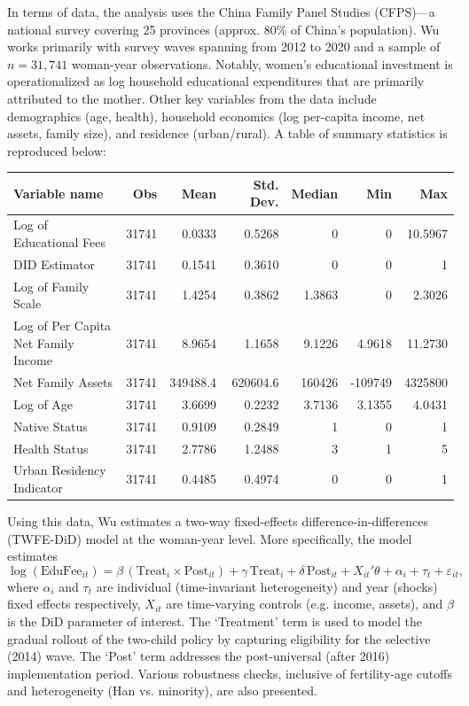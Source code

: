 \documentclass[11pt,answers]{exam}
\begin{document}
\begin{questions}
In terms of data, the analysis uses the China Family Panel Studies (CFPS)---a national survey covering 25 provinces (approx. 80\% of China's population). Wu works primarily with survey waves spanning from 2012 to 2020 and a sample of $n=31{,}741$ woman-year observations. Notably, women's educational investment is operationalized as log household educational expenditures that are primarily attributed to the mother. Other key variables from the data include demographics (age, health), household economics (log per-capita income, net assets, family size), and residence (urban/rural). A table of summary statistics is reproduced below:

  \small
  \begin{tabular}{lrrrrrr}
    \hline
    \textbf{Variable name} & \textbf{Obs} & \textbf{Mean} & \textbf{Std. Dev.} & \textbf{Median} & \textbf{Min} & \textbf{Max} \\
    \hline
    Log of Educational Fees                 & 31741 & 0.0333 & 0.5268 & 0       & 0       & 10.5967 \\
    DID Estimator                           & 31741 & 0.1541 & 0.3610 & 0       & 0       & 1       \\
    Log of Family Scale                     & 31741 & 1.4254 & 0.3862 & 1.3863  & 0       & 2.3026  \\
    Log of Per Capita Net Family Income     & 31741 & 8.9654 & 1.1658 & 9.1226  & 4.9618  & 11.2730 \\
    Net Family Assets                       & 31741 & 349488.4 & 620604.6 & 160426 & -109749 & 4325800 \\
    Log of Age                              & 31741 & 3.6699 & 0.2232 & 3.7136  & 3.1355  & 4.0431  \\
    Native Status                           & 31741 & 0.9109 & 0.2849 & 1       & 0       & 1       \\
    Health Status                           & 31741 & 2.7786 & 1.2488 & 3       & 1       & 5       \\
    Urban Residency Indicator               & 31741 & 0.4485 & 0.4974 & 0       & 0       & 1       \\
    \hline
  \end{tabular}

Using this data, Wu estimates a two-way fixed-effects difference-in-differences (TWFE-DiD) model at the woman-year level. More specifically, the model estimates
\[
\log(\text{EduFee}_{it})
= \beta\,(\text{Treat}_i \times \text{Post}_{it})
+ \gamma\,\text{Treat}_i
+ \delta\,\text{Post}_{it}
+ X_{it}'\theta
+ \alpha_i + \tau_t + \varepsilon_{it},
\]
where \(\alpha_i\) and \(\tau_t\) are individual (time-invariant heterogeneity) and year (shocks) fixed effects respectively, \(X_{it}\) are time-varying controls (e.g. income, assets), and \(\beta\) is the DiD parameter of interest. The `Treatment' term is used to model the gradual rollout of the two-child policy by capturing eligibility for the selective (2014) wave. The `Post' term addresses the post-universal (after 2016) implementation period. Various robustness checks, inclusive of fertility-age cutoffs and heterogeneity (Han vs. minority), are also presented.


\end{questions}
\end{document}
